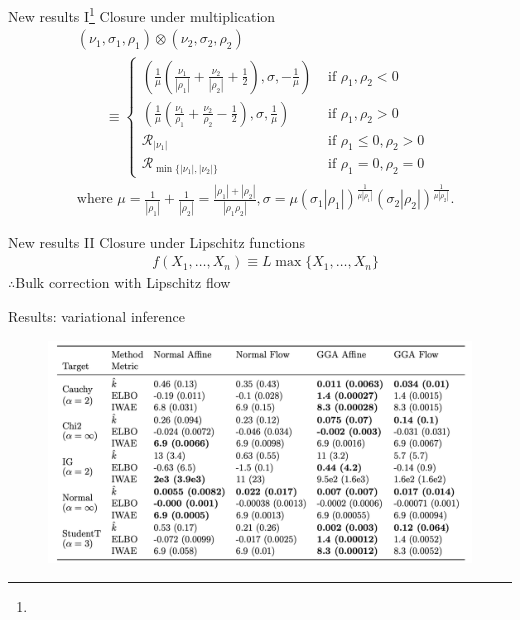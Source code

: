 \begin{frame}{New results I\footnote{}}
    Closure under multiplication
    \begin{align*}
        & (\nu_{1},\sigma_{1},\rho_{1})\otimes(\nu_{2},\sigma_{2},\rho_{2}) \\
        &\qquad \equiv\begin{cases}
        \left(\frac{1}{\mu}\left(\frac{\nu_{1}}{|\rho_{1}|}+\frac{\nu_{2}}{|\rho_{2}|}+\frac{1}{2}\right),\sigma,-\frac{1}{\mu}\right) & \text{ if }\rho_{1},\rho_{2}<0\\
        \left(\frac{1}{\mu}\left(\frac{\nu_{1}}{\rho_{1}}+\frac{\nu_{2}}{\rho_{2}}-\frac{1}{2}\right),\sigma,\frac{1}{\mu}\right) & \text{ if }\rho_{1},\rho_{2}>0\\
        \mathcal{R}_{|\nu_1|} & \mbox{ if }\rho_{1}\leq0,\rho_{2}>0 \\
        \mathcal{R}_{\min\{|\nu_1|,|\nu_2|\}} & \mbox{ if }\rho_{1}=0,\rho_{2}=0
        \end{cases} \\
        &\text{where }\mu=\frac{1}{|\rho_{1}|}+\frac{1}{|\rho_{2}|}=\frac{|\rho_{1}|+|\rho_{2}|}{|\rho_{1}\rho_{2}|}, \sigma=\mu(\sigma_{1}|\rho_{1}|)^{\frac{1}{\mu|\rho_{1}|}}(\sigma_{2}|\rho_{2}|)^{\frac{1}{\mu|\rho_{2}|}}.
    \end{align*}
\end{frame}

\begin{frame}{New results II}
    Closure under Lipschitz functions
    \begin{align*}
        & f(X_1,\dots,X_n) \equiv L \max\{X_1,\dots,X_n\}
    \end{align*}
    \pause
    $\therefore$\quad Bulk correction with Lipschitz flow
    \begin{figure}
        \centering
        \resizebox{\textwidth}{!}{
    		
		}
	\end{figure}
\end{frame}

\begin{subframe}{Results: variational inference}
    \begin{figure}
        \centering
        \includegraphics[width=\textwidth]{Figures/gga/vi.png}
    \end{figure}
\end{subframe}

